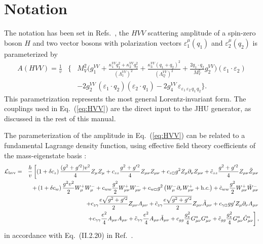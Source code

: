 \documentclass[aps,superscriptaddress,nofootinbib]{revtex4}
\begin{document}


\section{Notation}

The notation has been set in Refs.~\cite{Gao:2010qx,Bolognesi:2012,Anderson:2013,Gritsan:2016hjl,Gritsan:2020pib},
the $HVV$ scattering amplitude of a spin-zero boson $H$ and two vector bosons with polarization vectors 
$\varepsilon_{1}^\mu(q_1)$ and $\varepsilon_{2}^\mu(q_2)$
is parameterized by
\begin{eqnarray}
  A({H V V}) \!=\! \frac{1}{v} &\bigg\{  &
                          M_V^2 \bigg(g_{1}^{VV} 
+ \frac{\kappa_1^{VV}q_{1}^2 + \kappa_2^{VV} q_{2}^{2}}{\left(\Lambda_{1}^{VV} \right)^{2}} + \frac{\kappa_3^{VV} (q_1+q_2)^2}{\left(\Lambda_{Q}^{VV} \right)^{2}} 
+ \frac{2 q_1\cdot q_2}{M_V^2} g_2^{VV}\bigg) (\varepsilon_1 \cdot \varepsilon_2) 
\nonumber \\ &&
                        -2 g_2^{VV} \, {(\varepsilon_1 \cdot q_2)(\varepsilon_2 \cdot q_1)}
                        -2  g_4^{VV} \, {\varepsilon_{\varepsilon_1\,\varepsilon_2\,q_1\,q_2}}
                               \bigg\}.
\label{eq:HVV}
\end{eqnarray}
This parametrization represents the most general Lorentz-invariant form. 
The couplings used in Eq.~(\ref{eq:HVV}) are the direct input to the JHU generator, as discussed
in the rest of this manual. 

The parameterization of the amplitude in Eq.~(\ref{eq:HVV}) can be related to a fundamental Lagrange density function,
using effective field theory coefficients of the mass-eigenstate basis \cite{deFlorian:2016spz}:
\begin{eqnarray}
\label{eq:EFT_hvv}
 {\cal L}_{\rm hvv} =& & {h \over v} \left [ 
  \left (1 +  \delta c_z \right )  {(g^2+g^{\prime 2}) v^2 \over 4} Z_\mu Z_\mu
+ c_{zz} {g^2 + g'{}^2 \over  4} Z_{\mu \nu} Z_{\mu\nu}  
+c_{z \Box} g^2 Z_\mu \partial_\nu Z_{\mu \nu}
+ \tilde c_{zz}  {g^2 + g'{}^2  \over  4} Z_{\mu \nu} \tilde Z_{\mu\nu}
\right . \nonumber \\ & & \left . 
% 
% 
 +\left (1 +  \delta c_w \right )  {g^2 v^2 \over 2} W_\mu^+ W_\mu^- 
+ c_{ww}  {g^2 \over  2} W_{\mu \nu}^+  W_{\mu\nu}^- 
+ c_{w \Box} g^2 \left (W_\mu^- \partial_\nu W_{\mu \nu}^+ + {\mathrm h.c.} \right )  
 + \tilde c_{ww}  {g^2 \over  2} W_{\mu \nu}^+   \tilde W_{\mu\nu}^- 
 \right . \nonumber \\ & & \left . 
% 
% 
+ c_{z \gamma} {e \sqrt{g^2 + g'{}^2}  \over  2} Z_{\mu \nu} A_{\mu\nu} 
+ \tilde c_{z \gamma} {e \sqrt{g^2 + g'{}^2} \over  2} Z_{\mu \nu} \tilde A_{\mu\nu}
+ c_{\gamma \Box} g g' Z_\mu \partial_\nu A_{\mu \nu}
\right . \nonumber \\ & & \left . 
% 
% 
+ c_{\gamma \gamma} {e^2 \over 4} A_{\mu \nu} A_{\mu \nu} 
+ \tilde c_{\gamma \gamma} {e^2 \over 4} A_{\mu \nu} \tilde A_{\mu \nu} 
+  c_{gg} {g_s^2 \over 4 } G_{\mu \nu}^a G_{\mu \nu}^a   
+  \tilde c_{gg} {g_s^2 \over 4} G_{\mu \nu}^a \tilde G_{\mu \nu}^a  
\right ],
\end{eqnarray} 
in accordance with Eq.~(II.2.20) in Ref.~\cite{deFlorian:2016spz}.
\end{document}
